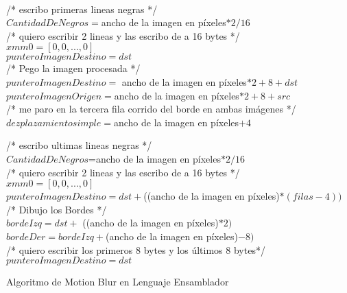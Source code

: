 ﻿\documentclass[a4paper]{article}
\begin{document}
\begin{algorithm}[H]
\ \\
/* escribo primeras lineas negras */\\
$CantidadDeNegros=$ancho de la imagen en p\'ixeles$*2/16$\\
/* quiero escribir 2 lineas y las escribo de a 16 bytes */\\
$xmm0=[0,0,...,0]$\\
$punteroImagenDestino=dst$\\
/* Pego la imagen procesada */\\
$punteroImagenDestino =$ ancho de la imagen en p\'ixeles$*2 + 8 + dst$\\
$punteroImagenOrigen = $ancho de la imagen en p\'ixeles$*2 + 8 + src$\\
/* me paro en la tercera fila corrido del borde en ambas imágenes */
$dezplazamientosimple =  $ancho de la imagen en píxeles$ + 4$


/* escribo ultimas lineas negras */\\
$CantidadDeNegros$=ancho de la imagen en píxeles$*2/16$\\
/* quiero escribir 2 lineas y las escribo de a 16 bytes */\\
$xmm0=[0,0,...,0]$\\
$punteroImagenDestino=dst + $((ancho de la imagen en píxeles)$ * (filas - 4))$\\
/* Dibujo los Bordes */\\
$bordeIzq=dst +$ ((ancho de la imagen en píxeles)$ * 2)$\\
$bordeDer= bordeIzq + $(ancho de la imagen en píxeles)$ - 8)$\\
/* quiero escribir los primeros 8 bytes y los últimos 8 bytes*/\\
$punteroImagenDestino=dst$\\
\caption{Algoritmo de Motion Blur en Lenguaje Ensamblador}
\end{algorithm}
\end{document}
